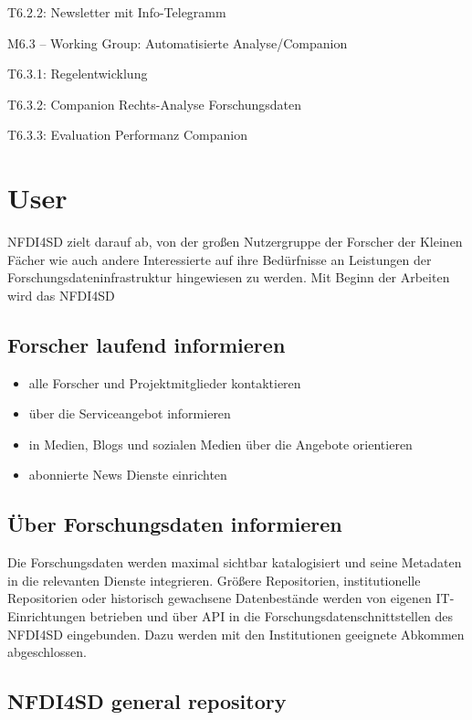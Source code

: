 \documentclass[
  english,
  paper=a4,
  oneside,captions=tableheading
]{scrbook}
\begin{document}
T6.2.2: Newsletter mit Info-Telegramm

M6.3 -- Working Group: Automatisierte Analyse/Companion

T6.3.1: Regelentwicklung

T6.3.2: Companion Rechts-Analyse Forschungsdaten

T6.3.3: Evaluation Performanz Companion

\hypertarget{user}{%
\section{User}\label{user}}

NFDI4SD zielt darauf ab, von der großen Nutzergruppe der Forscher der
Kleinen Fächer wie auch andere Interessierte auf ihre Bedürfnisse an
Leistungen der Forschungsdateninfrastruktur hingewiesen zu werden. Mit
Beginn der Arbeiten wird das NFDI4SD

\hypertarget{forscher-laufend-informieren}{%
\subsection{Forscher laufend
informieren}\label{forscher-laufend-informieren}}

\begin{itemize}
\item
  alle Forscher und Projektmitglieder kontaktieren
\item
  über die Serviceangebot informieren
\item
  in Medien, Blogs und sozialen Medien über die Angebote orientieren
\item
  abonnierte News Dienste einrichten
\end{itemize}

\hypertarget{uxfcber-forschungsdaten-informieren}{%
\subsection{Über Forschungsdaten
informieren}\label{uxfcber-forschungsdaten-informieren}}

Die Forschungsdaten werden maximal sichtbar katalogisiert und seine
Metadaten in die relevanten Dienste integrieren. Größere Repositorien,
institutionelle Repositorien oder historisch gewachsene Datenbestände
werden von eigenen IT-Einrichtungen betrieben und über API in die
Forschungsdatenschnittstellen des NFDI4SD eingebunden. Dazu werden mit
den Institutionen geeignete Abkommen abgeschlossen.

\hypertarget{nfdi4sd-general-repository}{%
\subsection{NFDI4SD general
repository}\label{nfdi4sd-general-repository}}
\end{document}

